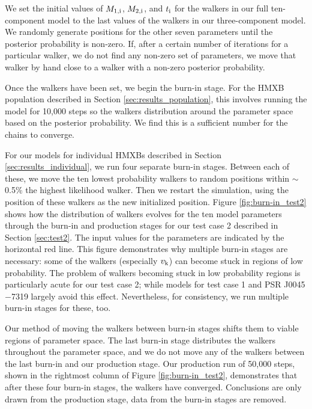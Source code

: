 \documentclass[usenatbib]{mnras}
\begin{document}
We set the initial values of $M_{\rm 1,i}$, $M_{\rm 2,i}$, and $t_{\rm i}$ for the walkers in our full ten-component model to the last values of the walkers in our three-component model. We randomly generate positions for the other seven parameters until the posterior probability is non-zero. If, after a certain number of iterations for a particular walker, we do not find any non-zero set of parameters, we move that walker by hand close to a walker with a non-zero posterior probability. 


Once the walkers have been set, we begin the burn-in stage. For the HMXB population described in Section \ref{sec:results_population}, this involves running the model for 10,000 steps so the walkers distribution around the parameter space based on the posterior probability. We find this is a sufficient number for the chains to converge. 


For our models for individual HMXBs described in Section \ref{sec:results_individual}, we run four separate burn-in stages. Between each of these, we move the ten lowest probability walkers to random positions within $\sim$0.5\% the highest likelihood walker. Then we restart the simulation, using the position of these walkers as the new initialized position. Figure \ref{fig:burn-in_test2} shows how the distribution of walkers evolves for the ten model parameters through the burn-in and production stages for our test case 2 described in Section \ref{sec:test2}. The input values for the parameters are indicated by the horizontal red line. This figure demonstrates why multiple burn-in stages are necessary: some of the walkers (especially $v_{\rm k}$) can become stuck in regions of low probability. The problem of walkers becoming stuck in low probability regions is particularly acute for our test case 2; while models for test case 1 and PSR J0045$-$7319 largely avoid this effect. Nevertheless, for consistency, we run multiple burn-in stages for these, too.


Our method of moving the walkers between burn-in stages shifts them to viable regions of parameter space. The last burn-in stage distributes the walkers throughout the parameter space, and we do not move any of the walkers between the last burn-in and our production stage. Our production run of 50,000 steps, shown in the rightmost column of Figure \ref{fig:burn-in_test2}, demonstrates that after these four burn-in stages, the walkers have converged. Conclusions are only drawn from the production stage, data from the burn-in stages are removed.
\end{document}
